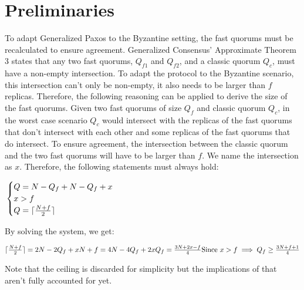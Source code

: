 \section{Preliminaries}

To adapt Generalized Paxos to the Byzantine setting, the fast quorums must be recalculated to ensure agreement. Generalized Consensus' Approximate Theorem 3 states that any two fast quorums, $Q_{f1}$ and $Q_{f2}$, and a classic quorum $Q_c$, must have a non-empty intersection. To adapt the protocol to the Byzantine scenario, this intersection can't only be non-empty, it also needs to be larger than $f$ replicas. Therefore, the following reasoning can be applied to derive the size of the fast quorums. Given two fast quorums of size $Q_f$ and classic quorum $Q_c$, in the worst case scenario $Q_c$ would intersect with the replicas of the fast quorums that don't intersect with each other and some replicas of the fast quorums that do intersect. To ensure agreement, the intersection between the classic quorum and the two fast quorums will have to be larger than $f$. We name the intersection as $x$. Therefore, the following statements must always hold:

$\\ \begin{cases}
		Q = N - Q_f + N-Q_f + x \\
		x > f \\
		Q = \lceil \frac{N+f}{2}\rceil
\end{cases} \\$

By solving the system, we get:

$\lceil\frac{N+f}{2}\rceil = 2N - 2Q_f + x \\
N+f = 4N - 4Q_f + 2x \\
Q_f = \frac{3N+2x-f}{4} \\ 
\text{Since $x > f$} \implies Q_f \geq \frac{3N+f+1}{4} \\$


\par
Note that the ceiling is discarded for simplicity but the implications of that aren't fully accounted for yet.
